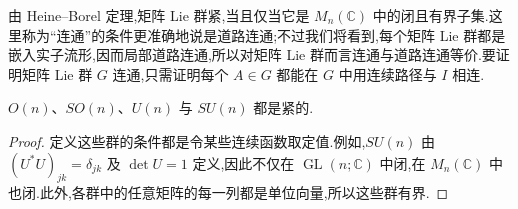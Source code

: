 由 Heine--Borel 定理,矩阵 Lie 群紧,当且仅当它是 $M_n(\mathbb C)$ 中的闭且有界子集.这里称为“连通”的条件更准确地说是道路连通;不过我们将看到,每个矩阵 Lie 群都是嵌入实子流形,因而局部道路连通,所以对矩阵 Lie 群而言连通与道路连通等价.要证明矩阵 Lie 群 $G$ 连通,只需证明每个 $A\in G$ 都能在 $G$ 中用连续路径与 $I$ 相连.

\begin{example}\label{ex:compact-matrix-lie-groups}
$O(n)$、$SO(n)$、$U(n)$ 与 $SU(n)$ 都是紧的.
\end{example}

\begin{proof}
定义这些群的条件都是令某些连续函数取定值.例如,$SU(n)$ 由 $(U^*U)_{jk}=\delta_{jk}$ 及 $\det U=1$ 定义,因此不仅在 $\operatorname{GL}(n;\mathbb C)$ 中闭,在 $M_n(\mathbb C)$ 中也闭.此外,各群中的任意矩阵的每一列都是单位向量,所以这些群有界.
\end{proof}

\def\ChapterSixteenProjectiveCover{
\begin{theorem}[有限维射影表示与万能覆盖]\label{thm:projective-representation-universal-cover}
设 $G$ 是矩阵 Lie 群,$(\widetilde G,\Phi)$ 是其万能覆盖.则:
\begin{enumerate}
\item 若 $\Pi:G\to PU(V)$ 是有限维射影酉表示,则存在 $\widetilde G$ 的普通酉表示 $\Sigma:\widetilde G\to U(V)$,使
\[
\Pi\circ\Phi=Q\circ\Sigma.
\]
任意这样的 $\Sigma$ 不可约,当且仅当 $\Pi$ 不可约;并且可要求 $\det\Sigma(A)=1$,在此条件下 $\Sigma$ 唯一.
\item 若 $\Sigma$ 是 $\widetilde G$ 的有限维不可约酉表示,则相应射影表示 $Q\circ\Sigma$ 的核包含覆盖映射 $\Phi$ 的核.因此 $Q\circ\Sigma$ 可下降到 $G$,给出 $G$ 的射影酉表示.
\end{enumerate}
因而有限维情形下,$G$ 的不可约射影酉表示与 $\widetilde G$ 的不可约、行列式为 $1$ 的普通酉表示一一对应.
\end{theorem}

\begin{proof}
设 $\mathfrak g$ 是 $G$ 的 Lie 代数.由命题~\ref{prop:projective-representation-lie-lift},可取普通表示 $\sigma:\mathfrak g\to\mathfrak u(V)$,使 $q\circ\sigma=\pi$.若 $\phi:\widetilde{\mathfrak g}\to\mathfrak g$ 是覆盖诱导的 Lie 代数同构,定义
\[
\widetilde\sigma(X)=\sigma(\phi(X)).
\]
因为 $\widetilde G$ 单连通,定理~\ref{thm:lie-algebra-homomorphism-integrates} 给出唯一 $\Sigma:\widetilde G\to U(V)$,满足 $\Sigma(e^X)=e^{\widetilde\sigma(X)}$.由 $q\circ\widetilde\sigma=\pi\circ\phi$,得到 $Q\circ\Sigma=\Pi\circ\Phi$.若要求 $\Sigma$ 取值于 $SU(V)$,则 $\sigma$ 取值于 $\mathfrak{su}(V)$,迹为零的条件使其唯一.

对第 2 条,$\ker\Phi$ 是 $\widetilde G$ 的离散正规子群,因而位于中心.若 $A\in\ker\Phi$,则 $\Sigma(A)$ 与所有 $\Sigma(B)$ 对易,是 $V$ 到自身的交织映射.由 Schur 引理,$\Sigma(A)=cI$,其中 $|c|=1$,所以 $A$ 在 $Q\circ\Sigma$ 的核中.
\end{proof}

}

